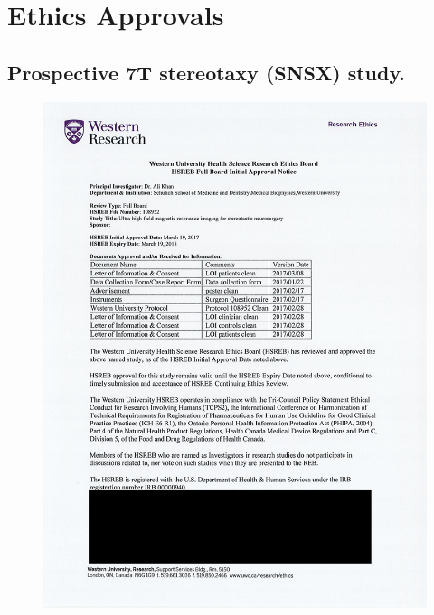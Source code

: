 \chapter{Ethics Approvals}\label{app:ethics}


\newpage
\section{Prospective 7T stereotaxy (SNSX) study.}\label{app:ethics:reb_details}
\begin{figure}[hbt!]
    \centering
    \includegraphics[width=0.9\linewidth]{figs/EthicsA.png}
    \label{fig:enter-label}
\end{figure}

\newpage
